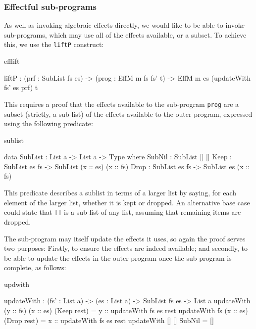\subsubsection{Effectful sub-programs}

As well as invoking algebraic effects directly, we would like to be able to
invoke sub-programs, which may use all of the effects available, or
a subset. To achieve this, we use the \texttt{liftP} construct:

\begin{SaveVerbatim}{efflift}

liftP : (prf : SubList fs es) ->
        (prog : EffM m fs fs' t) -> 
        EffM m es (updateWith fs' es prf) t

\end{SaveVerbatim}

\noindent
This requires a proof that the effects available to the sub-program \texttt{prog}
are a subset (strictly, a sub-list) of the effects available to the outer program,
expressed using the following predicate:

\begin{SaveVerbatim}{sublist}

data SubList : List a -> List a -> Type where
     SubNil : SubList [] []
     Keep   : SubList es fs -> 
              SubList (x :: es) (x :: fs)
     Drop   : SubList es fs -> 
              SubList es (x :: fs)

\end{SaveVerbatim}

\noindent
This predicate describes a sublist in terms of a larger list by saying, for each
element of the larger list, whether it is kept or dropped. An alternative
base case could state that \texttt{[]} is a sub-list of any list, assuming
that remaining items are dropped.

The sub-program may itself update the effects it uses, so again the proof serves
two purposes: Firstly, to ensure the effects are indeed available; and secondly,
to be able to update the effects in the outer program once the sub-program is
complete, as follows:

\begin{SaveVerbatim}{updwith}

updateWith : (fs' : List a) -> (es : List a) ->
             SubList fs es -> List a
updateWith (y :: fs) (x :: es) (Keep rest) 
           = y :: updateWith fs es rest
updateWith fs        (x :: es) (Drop rest) 
           = x :: updateWith fs es rest
updateWith []        []        SubNil      = []

\end{SaveVerbatim}

